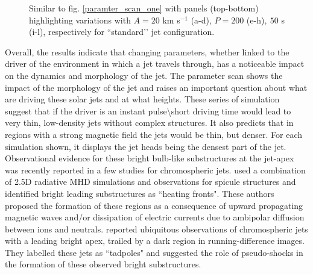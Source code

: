 \documentclass[12pt]{ociamthesis}
\newcommand{\fref}[1]{fig. \ref{#1}}
\begin{document}
\begin{figure}
\captionsetup[subfigure]{labelformat=empty}
\centering
{}
\caption{Similar to \fref{paramter_scan_one} with panels (top-bottom) highlighting variations with $A = 20$ km s$^{-1}$ (a-d), $P = 200$ (e-h)$,~50$ s (i-l), respectively for ``standard’’ jet configuration.}
\label{paramter_scan_two}
\end{figure}
Overall, the results indicate that changing parameters, whether linked to the driver of the environment in which a jet travels through, has a noticeable impact on the dynamics and morphology of the jet. The parameter scan shows the impact of the morphology of the jet and raises an important question about what are driving these solar jets and at what heights. These series of simulation suggest that if the driver is an instant pulse\textbackslash short driving time would lead to very thin, low-density jets without complex structures. It also predicts that in regions with a strong magnetic field the jets would be thin, but denser. For each simulation shown, it displays the jet heads being the densest part of the jet. Observational evidence for these bright bulb-like substructures at the jet-apex was recently reported in a few studies \citep{depontieu2017, srivastava2018NatAs} for chromospheric jets. \citet{depontieu2017} used a combination of 2.5D radiative MHD simulations and observations for spicule structures and identified bright leading substructures as ``heating fronts". These authors proposed the formation of these regions as a consequence of upward propagating magnetic waves and/or dissipation of electric currents due to ambipolar diffusion between ions and neutrals. \citet{srivastava2018NatAs} reported ubiquitous observations of chromospheric jets with a leading bright apex, trailed by a dark region in running-difference images. They labelled these jets as ``tadpoles" and suggested the role of pseudo-shocks in the formation of these observed bright substructures.
\end{document}
